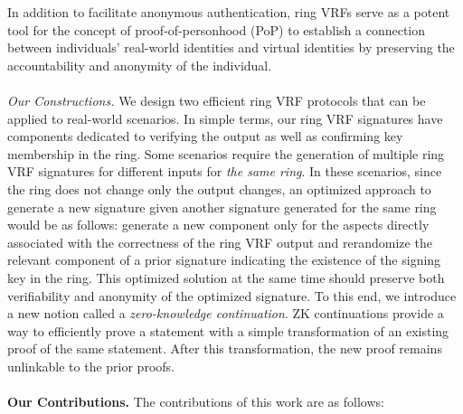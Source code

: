 In addition to facilitate anonymous authentication, ring VRFs  serve as a potent tool for the concept of proof-of-personhood (PoP) \cite{pop2008,pop2017,pop2020} to establish a connection between individuals' real-world identities and virtual identities by preserving the accountability and anonymity of the individual.
\\\\
\emph{Our Constructions.}
 We design two efficient ring VRF protocols that can be applied to real-world scenarios.
In simple terms,  our ring VRF signatures have components dedicated to verifying the output as well as confirming key membership in the ring. Some scenarios require the generation of multiple ring VRF signatures for different inputs for \emph{the same ring}. In these scenarios,  since the ring does not change only the output changes, an optimized approach to generate a new signature given another signature generated for the same ring would be as follows:  generate a new component only for the aspects directly associated with the correctness of the ring VRF output and  rerandomize the relevant component of a prior signature indicating the existence of the signing key in the ring. This optimized solution at the same time should preserve both verifiability and anonymity of the optimized signature.
To this end, we introduce a  new notion called  a \emph{zero-knowledge continuation}. ZK continuations provide a way to efficiently prove a statement with a simple transformation of an existing proof of the same statement. After this transformation, the new proof remains unlinkable to the prior proofs. 
\\\\
\noindent \textbf{Our Contributions.}  The contributions of this work are as follows:
